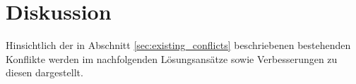 \section{Diskussion}
\label{sec:conflict_discussion}
Hinsichtlich der in Abschnitt \ref{sec:existing_conflicts} beschriebenen bestehenden Konflikte werden im nachfolgenden Lösungsansätze sowie Verbesserungen zu diesen dargestellt. 
